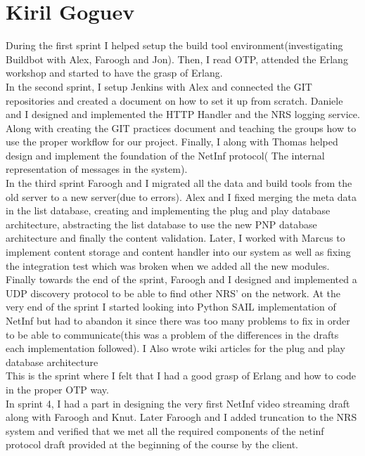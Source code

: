 \section{Kiril Goguev}

During the first sprint I helped setup the build tool environment(investigating Buildbot with Alex, Faroogh and Jon). Then, I read OTP, attended the Erlang workshop and started to have the grasp of Erlang.\\

In the second sprint, I setup Jenkins with Alex and connected the GIT repositories and created a document on how to set it up from scratch. 
Daniele and I designed and implemented the HTTP Handler and the NRS logging service. Along with creating the GIT practices document and teaching the groups how to use the proper workflow for our project. Finally,
I along with Thomas helped design and implement the foundation of the NetInf protocol( The internal representation of messages in the system).\\


In the third sprint
Faroogh and I migrated all the data and build tools from the old server to a new server(due to errors).
Alex and I fixed merging the meta data in the list database, creating and implementing the plug and play database architecture, abstracting the list database to use the new PNP database architecture and finally the content validation. 
Later, I worked with Marcus to implement content storage and content handler into our system as well as fixing the integration test which was broken when we added all the new modules. 
Finally towards the end of the sprint, Faroogh and I designed and implemented a UDP discovery protocol to be able to find other NRS' on the network.
At the very end of the sprint I started looking into Python SAIL implementation of NetInf but had to abandon it since there was too many problems to fix in order to be able to communicate(this was a problem of the differences in the drafts each implementation followed). 
I Also wrote wiki articles for the plug and play database architecture\\

This is the sprint where I felt that I had a good grasp of Erlang and how to code in the proper OTP way. \\

In sprint 4,
I had a part in designing the very first NetInf video streaming draft along with Faroogh and Knut. 
Later Faroogh and I added truncation to the NRS system and verified that we met all the required components of the netinf protocol draft provided at the beginning of the course by the client. \\

